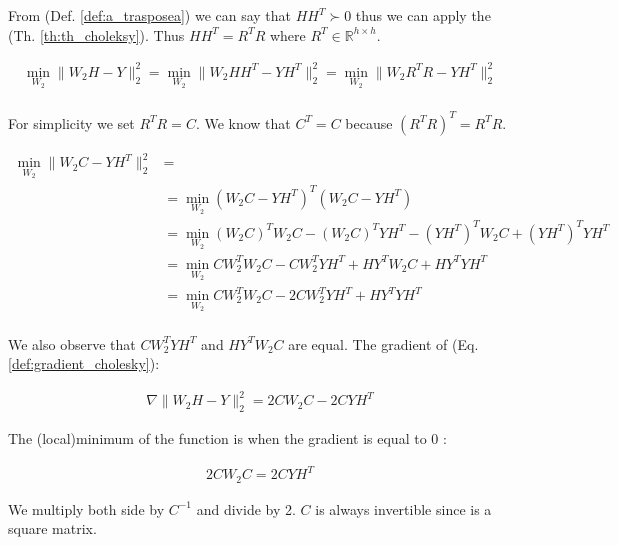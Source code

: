 From (Def. \ref{def:a_trasposea}) we can say that $HH^T \succ 0$ thus we can apply the (Th. \ref{th:th_choleksy}). Thus $HH^T = R^TR$ where $R^T \in \mathbb{R}^{h \times h}$.

\begin{equation}
    \label{def:gradient_cholesky}
    \begin{aligned}
        \min_{W_2} \|W_2H - Y\|_2^2 = \min_{W_2} \|W_2HH^T- YH^T\|_2^2 = \min_{W_2} \|W_2R^TR- YH^T\|_2^2\\
    \end{aligned}
\end{equation}

For simplicity we set $R^TR = C$. We know that $C^T = C$ because $(R^TR)^T = R^TR$.

\begin{equation}
    \label{def:gradient_cholesky}
    \begin{aligned}
        \min_{W_2} \|W_2C- YH^T\|_2^2 &= \\
        &= \min_{W_2} (W_2C - YH^T)^T(W_2C - YH^T)\\
        &= \min_{W_2} (W_2C)^TW_2C - (W_2C)^TYH^T - (YH^T)^TW_2C + (YH^T)^TYH^T \\
        &= \min_{W_2} CW_2^TW_2C - CW_2^TYH^T + HY^TW_2C + HY^TYH^T \\ 
        &= \min_{W_2} CW_2^TW_2C - 2CW_2^TYH^T + HY^TYH^T \\ 
    \end{aligned}
\end{equation}

We also observe that $CW_2^TYH^T$ and $HY^TW_2C$ are equal. The gradient of (Eq. \ref{def:gradient_cholesky}):

\begin{equation}
    \begin{aligned}
       \nabla \|W_2H- Y\|_2^2 = 2CW_2C - 2CYH^T 
    \end{aligned}
\end{equation}

The (local)minimum of the function is when the gradient is equal to 0 :

\begin{equation}
    \begin{aligned}
        2CW_2C = 2CYH^T
    \end{aligned}
\end{equation}

We multiply both side by $C^{-1}$ and divide by 2. $C$ is always invertible since is a square matrix.

